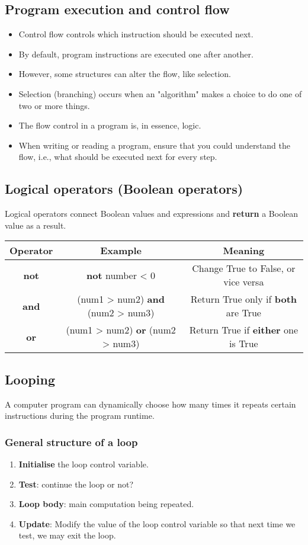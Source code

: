 \documentclass[11pt]{article}
\begin{document}
\subsection{Program execution and control flow}
\label{sec:org9880590}
\begin{itemize}
\item Control flow controls which instruction should be executed next.
\item By default, program instructions are executed one after another.
\item However, some structures can alter the flow, like selection.
\item Selection (branching) occurs when an "algorithm" makes a choice to do one of two or more things.
\item The flow control in a program is, in essence, logic.
\item When writing or reading a program, ensure that you could understand the flow, i.e., what should be executed next for every step.
\end{itemize}
\subsection{Logical operators (Boolean operators)}
\label{sec:orgd35a547}
Logical operators connect Boolean values and expressions and \textbf{return} a Boolean value as a result.

\begin{center}
\begin{tabular}{c|c|c}
Operator & Example & Meaning\\
\hline
\textbf{not} & \textbf{not} number < 0 & Change True to False, or vice versa\\
\textbf{and} & (num1 > num2) \textbf{and} (num2 > num3) & Return True only if \textbf{both} are True\\
\textbf{or} & (num1 > num2) \textbf{or} (num2 > num3) & Return True if \textbf{either} one is True\\
\end{tabular}
\end{center}

 \newpage
\subsection{Looping}
\label{sec:orgd5f7024}
A computer program can dynamically choose how many times it repeats certain instructions during the program runtime.
\subsubsection{General structure of a loop}
\label{sec:org42e84a3}
\begin{enumerate}
\item \textbf{Initialise} the loop control variable.
\item \textbf{Test}: continue the loop or not?
\item \textbf{Loop body}: main computation being repeated.
\item \textbf{Update}: Modify the value of the loop control variable so that next time we test, we may exit the loop.
\end{enumerate}
\end{document}
